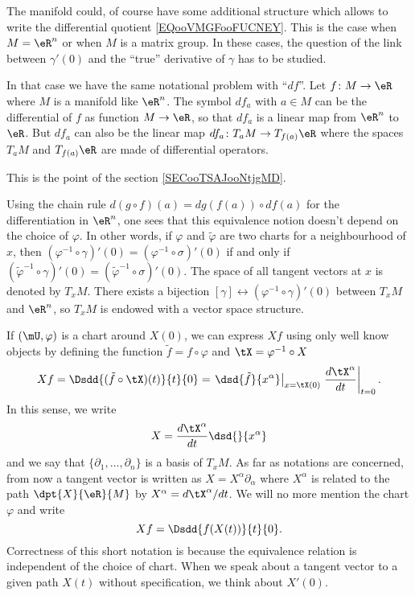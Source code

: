     The manifold could, of course have some additional structure which allows to write the differential quotient \eqref{EQooVMGFooFUCNEY}. This is the case when \( M=\eR^n\) or when \( M\) is a matrix group. In these cases, the question of the link between \( \gamma'(0)\) and the ``true'' derivative of \( \gamma\) has to be studied.

    In that case we have the same notational problem with ``$df$''. Let \( f\colon M\to \eR\) where \( M\) is a manifold like \( \eR^n\). The symbol \( df_a\) with \( a\in M\) can be the differential of \( f\) as function \( M\to \eR\), so that \( df_a\) is a linear map from \( \eR^n\) to \( \eR\). But \( df_a\) can also be the linear map \( df_a\colon T_aM\to T_{f(a)}\eR\) where the spaces \( T_aM\) and \( T_{f(a)}\eR\) are made of differential operators.

    This is the point of the section \ref{SECooTSAJooNtjgMD}.

Using the chain rule $d(g\circ f)(a)=dg(f(a))\circ df(a)$ for the differentiation in $\eR^n$, one sees that this equivalence notion doesn't depend on the choice of $\varphi$. In other words, if $\varphi$ and $\tilde{\varphi}$ are two charts for a neighbourhood of $x$, then $(\varphi^{-1} \circ\gamma)'(0)=(\varphi^{-1} \circ\sigma)'(0)$ if and only if $(\tilde{\varphi}^{-1} \circ\gamma)'(0)=(\tilde{\varphi}^{-1} \circ\sigma)'(0)$. The space of all tangent vectors at $x$ is denoted by $T_xM$. There exists a bijection $[\gamma]\leftrightarrow (\varphi^{-1}\circ\gamma)'(0)$ between $T_xM$ and $\eR^n$, so $T_xM$ is endowed with a vector space structure.

If $(\mU,\varphi)$ is a chart around $X(0)$, we can express $Xf$ using only well know objects by defining the function $\tilde f =f\circ\varphi$ and $\tX=\varphi^{-1}\circ X$
\[
  Xf=\Dsdd{ (\tilde f \circ\tX)(t) }{t}{0}=\left.\dsd{\tilde f }{x^{\alpha}}\right|_{x=\tX(0)}\left.\frac{d\tX^{\alpha}}{dt}\right|_{t=0}.
\]
In this sense, we write
\begin{equation}
  X=\frac{d\tX^{\alpha}}{dt} \dsd{}{x^{\alpha}}
\end{equation}
and we say that $\{\partial_1,\ldots,\partial_n\}$ is a basis of $T_xM$. As far as notations are concerned, from now a tangent vector is written as $X=X^{\alpha}\partial_{\alpha}$ where $X^{\alpha}$ is related to the path $\dpt{X}{\eR}{M}$ by $X^{\alpha}=d\tX^{\alpha}/dt$. We will no more mention the chart $\varphi$ and write
\[
  Xf=\Dsdd{f(X(t))}{t}{0}.
\]
Correctness of this short notation is because the equivalence relation is independent of the choice of chart. When we speak about a tangent vector to a given path $X(t)$ without specification, we think about $X'(0)$.

